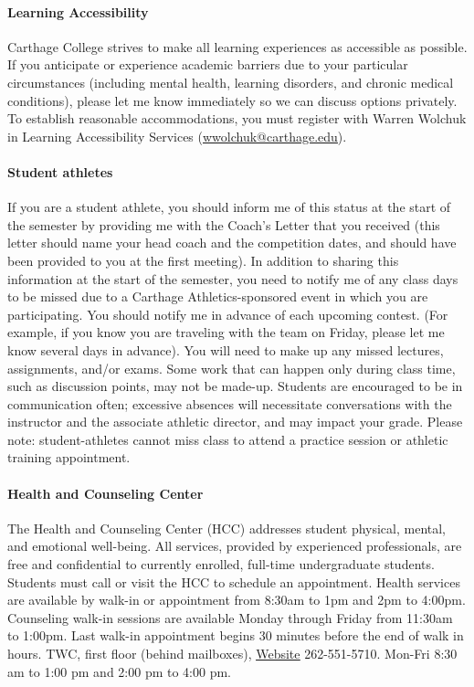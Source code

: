 \paragraph{Learning Accessibility} Carthage College strives to make all learning experiences as accessible as possible. If you anticipate or experience academic barriers due to your particular circumstances (including mental health, learning disorders, and chronic medical conditions), please let me know immediately so we can discuss options privately. To establish reasonable accommodations, you must register with Warren Wolchuk in Learning Accessibility Services (\href{mailto:wwolchuk@carthage.edu}{\underline{wwolchuk@carthage.edu}}).

\paragraph{Student athletes}If you are a student athlete, you should inform me of this status at the start of the semester by providing me with the Coach’s Letter that you received (this letter should name your head coach and the competition dates, and should have been provided to you at the first meeting). In addition to sharing this information at the start of the semester, you need to notify me of any class days to be missed due to a Carthage Athletics-sponsored event in which you are participating. You should notify me in advance of each upcoming contest. (For example, if you know you are traveling with the team on Friday, please let me know several days in advance). You will need to make up any missed lectures, assignments, and/or exams. Some work that can happen only during class time, such as discussion points, may not be made-up. Students are encouraged to be in communication often; excessive absences will necessitate conversations with the instructor and the associate athletic director, and may impact your grade. Please note: student-athletes cannot miss class to attend a practice session or athletic training appointment.

\paragraph{Health and Counseling Center}The Health and Counseling Center (HCC) addresses student physical, mental, and emotional well-being. All services, provided by experienced professionals, are free and confidential to currently enrolled, full-time undergraduate students. Students must call or visit the HCC to schedule an appointment. Health services are available by walk-in or appointment from 8:30am to 1pm and 2pm to 4:00pm. Counseling walk-in sessions are available Monday through Friday from 11:30am to 1:00pm. Last walk-in appointment begins 30 minutes before the end of walk in hours. TWC, first floor (behind mailboxes), \href{https://www.carthage.edu/life-at-carthage/health-wellness-safety/health-counseling/}{\underline{Website}} 262-551-5710. Mon-Fri 8:30 am to 1:00 pm and 2:00 pm to 4:00 pm. 